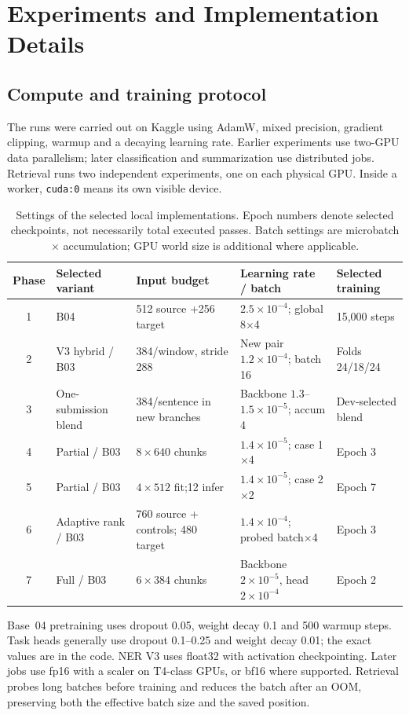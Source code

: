 \section{Experiments and Implementation Details}
\subsection{Compute and training protocol}
The runs were carried out on Kaggle using AdamW, mixed precision, gradient clipping, warmup and a decaying learning rate. Earlier experiments use two-GPU data parallelism; later classification and summarization use distributed jobs. Retrieval runs two independent experiments, one on each physical GPU. Inside a worker, \texttt{cuda:0} means its own visible device.

\begin{table}[H]
\centering\small
\caption{Settings of the selected local implementations. Epoch numbers denote selected checkpoints, not necessarily total executed passes. Batch settings are microbatch $\times$ accumulation; GPU world size is additional where applicable.}
\label{tab:hparams}
\begin{tabularx}{\textwidth}{clYYY}
\toprule
Phase & Selected variant & Input budget & Learning rate / batch & Selected training\\
 & B04 & 512 source +256 target & $2.5\!\times\!10^{-4}$; global 8$\times$4 & 15,000 steps\\
2 & V3 hybrid / B03 & 384/window, stride 288 & New pair $1.2\!\times\!10^{-4}$; batch 16 & Folds 24/18/24\\
3 & One-submission blend & 384/sentence in new branches & Backbone $1.3$--$1.5\!\times\!10^{-5}$; accum 4 & Dev-selected blend\\
4 & Partial / B03 & $8\times640$ chunks & $1.4\!\times\!10^{-5}$; case 1$\times$4 & Epoch 3\\
5 & Partial / B03 & $4\times512$ fit;12 infer & $1.4\!\times\!10^{-5}$; case 2$\times$2 & Epoch 7\\
6 & Adaptive rank / B03 & 760 source + controls; 480 target & $1.4\!\times\!10^{-4}$; probed batch$\times$4 & Epoch 3\\
7 & Full / B03 & $6\times384$ chunks & Backbone $2\!\times\!10^{-5}$, head $2\!\times\!10^{-4}$ & Epoch 2\\
\bottomrule
\end{tabularx}
\end{table}

Base~04 pretraining uses dropout 0.05, weight decay 0.1 and 500 warmup steps. Task heads generally use dropout 0.1--0.25 and weight decay 0.01; the exact values are in the code. NER V3 uses float32 with activation checkpointing. Later jobs use fp16 with a scaler on T4-class GPUs, or bf16 where supported. Retrieval probes long batches before training and reduces the batch after an OOM, preserving both the effective batch size and the saved position.

